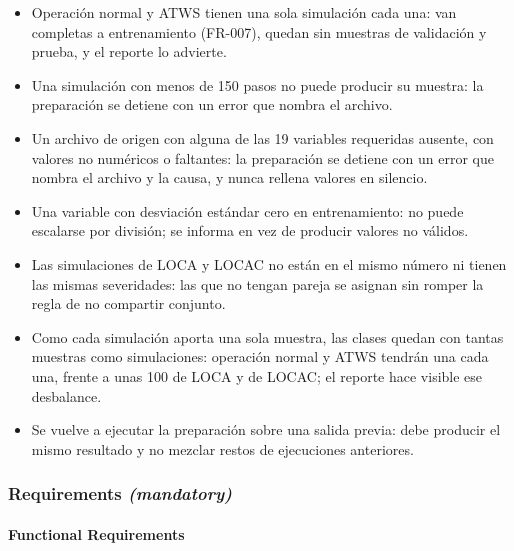 \documentclass[12pt,a4paper]{article}
\providecommand{\tightlist}{\setlength{\itemsep}{0pt}\setlength{\parskip}{0pt}}
\newenvironment{documentogenerado}[2]{%
  \def\doccomando{#1}\def\docruta{#2}%
  \par\begingroup\small\setstretch{1.15}\sloppy%
}{\endgroup\par\medskip}
\begin{document}
\begin{documentogenerado}{/speckit-specify + /speckit-clarify}{specs\slash 001-preparacion-datos\slash spec.md}
\begin{itemize}
\tightlist
\item
  Operación normal y ATWS tienen una sola simulación cada una: van completas a entrenamiento (FR-007), quedan sin muestras de validación y prueba, y el reporte lo advierte.
\item
  Una simulación con menos de 150 pasos no puede producir su muestra: la preparación se detiene con un error que nombra el archivo.
\item
  Un archivo de origen con alguna de las 19 variables requeridas ausente, con valores no numéricos o faltantes: la preparación se detiene con un error que nombra el archivo y la causa, y nunca rellena valores en silencio.
\item
  Una variable con desviación estándar cero en entrenamiento: no puede escalarse por división; se informa en vez de producir valores no válidos.
\item
  Las simulaciones de LOCA y LOCAC no están en el mismo número ni tienen las mismas severidades: las que no tengan pareja se asignan sin romper la regla de no compartir conjunto.
\item
  Como cada simulación aporta una sola muestra, las clases quedan con tantas muestras como simulaciones: operación normal y ATWS tendrán una cada una, frente a unas 100 de LOCA y de LOCAC; el reporte hace visible ese desbalance.
\item
  Se vuelve a ejecutar la preparación sobre una salida previa: debe producir el mismo resultado y no mezclar restos de ejecuciones anteriores.
\end{itemize}

\subsubsection{\texorpdfstring{Requirements \emph{(mandatory)}}{Requirements (mandatory)}}

\paragraph{Functional Requirements}


\end{documentogenerado}
\end{document}
